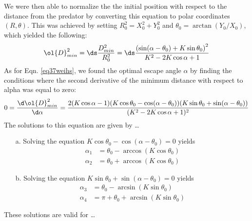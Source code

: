 We were then able to normalize the the initial position with respect to the distance from the predator by converting this equation to polar coordinates $(R, \theta)$. This was achieved by setting $R_0^2 = X_0^2 + Y_0^2$ and $\theta_0 = \arctan(Y_0/X_0)$, which yielded the following:
%
\begin{equation}
\ol{D}^2_{min}= \ds\frac{{D}^2_{min}}{R_0^2 }=
\ds\frac{\left ( \sin(\alpha - \theta_0) + K \sin \theta_0 \right )^2}{K^2-2 K \cos \alpha +1} 
\label{Dmin_polar}
\end{equation}
%
As for Eqn. \ref{eq37weihs}, we found the optimal escape angle $\alpha$ by finding the conditions where the second derivative of the minimum distance with respect to alpha was equal to zero:
%
\begin{equation}
0 = \frac{\d \ol{D}^2_{min}}{\d \alpha} = 
\frac{2(K \cos \alpha - 1)(K\cos \theta_0 - \cos(\alpha - \theta_0))(K\sin \theta_0 + \sin(\alpha -\theta_0))}
{(K^2 - 2K \cos \alpha + 1)^2}
\end{equation} 
%
The solutions to this equation are given by \dots
\begin{enumerate}
\item[a.] Solving the equation $K\cos \theta_0 - \cos(\alpha - \theta_0) = 0$ yields
%
\begin{align*}
\alpha_1 & = \theta_0 - \arccos(K \cos \theta_0) \\
\alpha_2 & = \theta_0 + \arccos(K \cos \theta_0)
\end{align*}
%
\item[b.] Solving the equation $K\sin \theta_0 + \sin(\alpha -\theta_0) = 0$ yields
%
\begin{align*}
\alpha_3 & = \theta_0 - \arcsin(K \sin \theta_0) \\
\alpha_4 & = \pi + \theta_0 + \arcsin(K \sin \theta_0)
\end{align*}
%
\end{enumerate}
These solutions are valid for \dots



